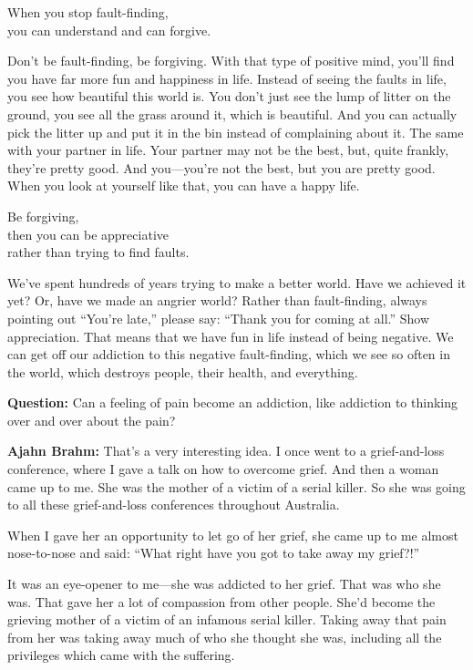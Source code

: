 \documentclass[12pt, openany]{book}
\newenvironment{aphorism}%
{%
\begin{center}\begin{itshape}
}%
{\end{itshape}\end{center}
}%
\begin{document}
\begin{aphorism}
When you stop fault-finding,\\  
you can understand and can forgive.
\end{aphorism}

Don’t be fault-finding, be forgiving. With that type of positive mind, you’ll find you have far more fun and happiness in life. Instead of seeing the faults in life, you see how beautiful this world is. You don’t just see the lump of litter on the ground, you see all the grass around it, which is beautiful. And you can actually pick the litter up and put it in the bin instead of complaining about it. The same with your partner in life. Your partner may not be the best, but, quite frankly, they’re pretty good. And you—you’re not the best, but you are pretty good. When you look at yourself like that, you can have a happy life. 

\begin{aphorism}
Be forgiving,\\  
then you can be appreciative\\ 
rather than trying to find faults.
\end{aphorism}

We’ve spent hundreds of years trying to make a better world. Have we achieved it yet? Or, have we made an angrier world? Rather than fault-finding, always pointing out “You’re late,” please say: “Thank you for coming at all.” Show appreciation. That means that we have fun in life instead of being negative. We can get off our addiction to this negative fault-finding, which we see so often in the world, which destroys people, their health, and everything. 

\textbf{Question:} Can a feeling of pain become an addiction, like addiction to thinking over and over about the pain? 

\textbf{Ajahn Brahm:} That’s a very interesting idea. I once went to a grief-and-loss conference, where I gave a talk on how to overcome grief. And then a woman came up to me. She was the mother of a victim of a serial killer. So she was going to all these grief-and-loss conferences throughout Australia. 

When I gave her an opportunity to let go of her grief, she came up to me almost nose-to-nose and said: “What right have you got to take away my grief?!” 

It was an eye-opener to me—she was addicted to her grief. That was who she was. That gave her a lot of compassion from other people. She’d become the grieving mother of a victim of an infamous serial killer. Taking away that pain from her was taking away much of who she thought she was, including all the privileges which came with the suffering. 
\end{document}
